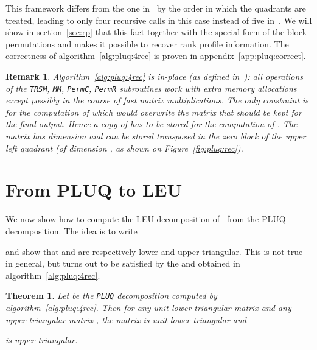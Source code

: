 \documentclass{article}
\newcommand{\pluq}{\texttt{PLUQ}\xspace}
\newcommand{\trsm}{\texttt{TRSM}\xspace}
\newcommand{\MM}{\texttt{MM}\xspace}
\newtheorem{theorem}{Theorem}
\newtheorem{remark}{Remark}
\begin{document}
This framework differs from the one in~\cite{jgd:2002:PComp} by the order in
which the quadrants are treated, leading to only four recursive calls in this
case instead of five in~\cite{jgd:2002:PComp}. We will show in
section~\ref{sec:rp} that this fact together with the special form of the block
permutations  and  makes it possible to recover rank profile information. 
The correctness of algorithm~\ref{alg:pluq:4rec} is proven in appendix~\ref{app:pluq:correct}.
\begin{remark}
Algorithm~\ref{alg:pluq:4rec} is in-place (as defined
in~\cite[Definition 1]{JPS:2011}):
all operations of the \trsm, \MM,
\texttt{PermC}, \texttt{PermR} subroutines work with  extra memory
allocations except possibly in the course of fast matrix multiplications.
The only constraint is for the computation of  which
would overwrite the matrix  that should be kept  for the final output. 
Hence a copy of  has to  be stored for the computation of . The matrix 
has dimension  and can be stored transposed in the zero block of
the upper left quadrant (of dimension , as
shown on Figure~\ref{fig:pluq:rec}).
\end{remark}
 \section{From PLUQ to LEU}\label{sec:leu}

\renewcommand{\arraystretch}{0.91}
\setlength{\arraycolsep}{.12\arraycolsep}

We now show how to compute the LEU decomposition of~\cite{Malaschonok:2010}
from the PLUQ decomposition. The idea is to write 

 and show that  and  are respectively lower and
 upper triangular. This is not true in general, but turns out to be
 satisfied by the  and  obtained in
 algorithm~\ref{alg:pluq:4rec}.\setlength{\arraycolsep}{.13\arraycolsep}
\begin{theorem}
Let  be the \pluq decomposition computed by algorithm~\ref{alg:pluq:4rec}.
Then for any unit lower triangular matrix  and any upper triangular matrix ,
the matrix
 is  unit lower triangular and

is upper triangular.
\end{theorem}
\end{document}
